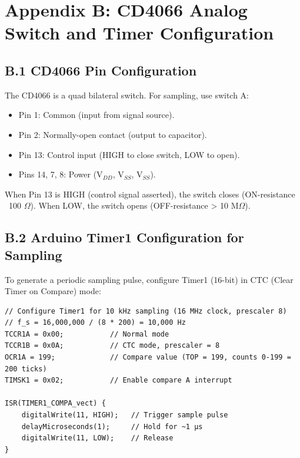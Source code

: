 \documentclass[11pt,letterpaper]{article}
\begin{document}
\clearpage

\section*{Appendix B: CD4066 Analog Switch and Timer Configuration}

\subsection*{B.1 CD4066 Pin Configuration}

The CD4066 is a quad bilateral switch. For sampling, use switch A:
\begin{itemize}
    \item Pin 1: Common (input from signal source).
    \item Pin 2: Normally-open contact (output to capacitor).
    \item Pin 13: Control input (HIGH to close switch, LOW to open).
    \item Pins 14, 7, 8: Power (V$_{DD}$, V$_{SS}$, V$_{SS}$).
\end{itemize}

When Pin 13 is HIGH (control signal asserted), the switch closes (ON-resistance ~100 $\Omega$). When LOW, the switch opens (OFF-resistance > 10 M$\Omega$).

\subsection*{B.2 Arduino Timer1 Configuration for Sampling}

To generate a periodic sampling pulse, configure Timer1 (16-bit) in CTC (Clear Timer on Compare) mode:

\begin{verbatim}
// Configure Timer1 for 10 kHz sampling (16 MHz clock, prescaler 8)
// f_s = 16,000,000 / (8 * 200) = 10,000 Hz
TCCR1A = 0x00;           // Normal mode
TCCR1B = 0x0A;           // CTC mode, prescaler = 8
OCR1A = 199;             // Compare value (TOP = 199, counts 0-199 = 200 ticks)
TIMSK1 = 0x02;           // Enable compare A interrupt

ISR(TIMER1_COMPA_vect) {
    digitalWrite(11, HIGH);   // Trigger sample pulse
    delayMicroseconds(1);     // Hold for ~1 µs
    digitalWrite(11, LOW);    // Release
}
\end{verbatim}
\end{document}
